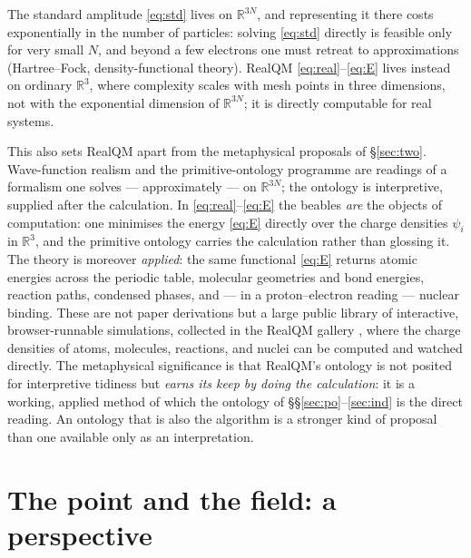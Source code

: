 \documentclass[11pt]{article}
\begin{document}
The standard amplitude \eqref{eq:std} lives on $\mathbb R^{3N}$, and representing it there costs
exponentially in the number of particles: solving \eqref{eq:std} directly is feasible only for very small
$N$, and beyond a few electrons one must retreat to approximations (Hartree--Fock, density-functional
theory). RealQM \eqref{eq:real}--\eqref{eq:E} lives instead on ordinary $\mathbb R^3$, where complexity
scales with mesh points in three dimensions, not with the exponential dimension of $\mathbb R^{3N}$; it is
directly computable for real systems.

This also sets RealQM apart from the metaphysical proposals of \S\ref{sec:two}. Wave-function realism and
the primitive-ontology programme are readings of a formalism one solves --- approximately --- on
$\mathbb R^{3N}$; the ontology is interpretive, supplied after the calculation. In
\eqref{eq:real}--\eqref{eq:E} the beables \emph{are} the objects of computation: one minimises the energy
\eqref{eq:E} directly over the charge densities $\psi_i$ in $\mathbb R^3$, and the primitive ontology
carries the calculation rather than glossing it. The
theory is moreover \emph{applied}: the same functional \eqref{eq:E} returns atomic energies across the
periodic table, molecular geometries and bond energies, reaction paths, condensed phases, and --- in a
proton--electron reading --- nuclear binding. These are not paper derivations but a large public library of
interactive, browser-runnable simulations, collected in the RealQM gallery \cite{RealQMgallery}, where the
charge densities of atoms, molecules, reactions, and nuclei can be computed and watched directly. The
metaphysical significance is that RealQM's ontology is not posited for interpretive
tidiness but \emph{earns its keep by doing the calculation}: it is a working, applied method of which the
ontology of \S\S\ref{sec:po}--\ref{sec:ind} is the direct reading. An ontology that is also the algorithm
is a stronger kind of proposal than one available only as an interpretation.

\section{The point and the field: a perspective}
\label{sec:sm}
\end{document}
